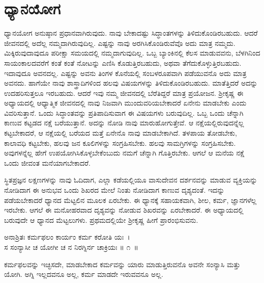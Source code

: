 
\chapter{ಧ್ಯಾನಯೋಗ}

ಧ್ಯಾನಯೋಗ ಅನುಷ್ಠಾನ ಪ್ರಧಾನವಾಗಿರುವುದು. ನಾವು ಬೇಕಾದಷ್ಟು ಸಿದ್ಧಾಂತಗಳನ್ನು ತಿಳಿದು\-ಕೊಂಡಿರಬಹುದು. ಆದರೆ ಜೀವನದಲ್ಲಿ ಅದೆಲ್ಲ ನಮ್ಮದಾಗಿರುವುದಿಲ್ಲ. ಎಷ್ಟನ್ನು ನಾವು ಅರಗಿಸಿಕೊಂಡಿರುವೆವೊ ಅದು ಮಾತ್ರ ನಮ್ಮದು. ಮಿಕ್ಕಿರುವುದಾವುದೂ ಪರೀಕ್ಷಾ ಸಮಯದಲ್ಲಿ ನಮ್ಮದಾಗುವುದಿಲ್ಲ. ಒಬ್ಬ ಬ್ಯಾಂಕಿನಲ್ಲಿ ಕೆಲಸ ಮಾಡುವವನು, ಬೆಳಗಿನಿಂದ ಸಾಯಂಕಾಲದವರೆಗೆ ಕಂತೆ ಕಂತೆ ನೋಟನ್ನು ಎಣಿಸಿ ಕೊಡುತ್ತಿರಬಹುದು, ಅಥವಾ ತೆಗೆದುಕೊಳ್ಳುತ್ತಿರಬಹುದು. ಇದಾವುದೂ ಅವನದಲ್ಲ. ಎಷ್ಟನ್ನು ಅವನು ತಿಂಗಳ ಕೊನೆಯಲ್ಲಿ ಸಂಬಳರೂಪವಾಗಿ ಪಡೆಯು\-ವನೊ ಅದು ಮಾತ್ರ ಅವನದು. ಹಾಗೆಯೇ ನಾವು ಶಾಸ್ತ್ರಾದಿಗಳಿಂದ ಹಲವು ವಿಷಯಗಳನ್ನು ತಿಳಿದುಕೊಂಡಿರಬಹುದು. ಮಾತೆತ್ತಿದರೆ ಅದನ್ನು ಉದಹರಿಸುತ್ತಲೂ ಇರಬಹುದು. ಆದರೆ ಇವು ನಮ್ಮ ಜೀವನದಲ್ಲಿ ಬೆರೆತಿದ್ದರೆ ಮಾತ್ರ ಪ್ರಯೋಜನ. ಶ‍್ರೀಕೃಷ್ಣ ಈ ಅಧ್ಯಾಯದಲ್ಲಿ ಆಧ್ಯಾತ್ಮಿಕ ಜೀವನದಲ್ಲಿ ನಾವು ನಿಜವಾಗಿ ಮುಂದುವರಿಯಬೇಕಾದರೆ ಏನೇನು ಮಾಡಬೇಕು ಎಂದು ವಿವರಿಸುತ್ತಾನೆ. ಒಂದು ಸಿದ್ಧಾಂತವನ್ನು ಪ್ರತಿಪಾದಿಸುವಾಗ ಈ ವಿಷಯಗಳು ಬರುವುದಿಲ್ಲ. ಒಬ್ಬ ಒಂದು ಚೆನ್ನಾಗಿ ಕಾಣುವ ಕಟ್ಟಡದ ನಕ್ಷೆ ಬರೆಯುತ್ತಾನೆ. ಅದನ್ನು ನೋಡಿ ನಾವು ಮಾರುಹೋಗುತ್ತೇವೆ. ಆ ನಕ್ಷೆಯಲ್ಲಿರುವುದನ್ನೆಲ್ಲ ಕಟ್ಟಬೇಕಾದರೆ, ಆ ನಕ್ಷೆಯಲ್ಲಿ ಬರೆಯದ ಮತ್ತೆ ಏನೇನೊ ನಾವು ಮಾಡಬೇಕಾಗಿದೆ. ತಳಪಾಯ ತೋಡಬೇಕು, ಕಾಲಾವಧಿ ಕಟ್ಟಬೇಕು, ಹಲವು ಜನ ಕೂಲಿಗಳನ್ನು ಸಂಗ್ರಹಿಸಬೇಕು. ಹಲವು ಸಾಮಗ್ರಿಗಳನ್ನು ಸಂಗ್ರಹಿಸಬೇಕು. ಅವುಗಳನ್ನೆಲ್ಲ ಹೇಗೆ ಉಪಯೋಗಿಸಿಕೊಳ್ಳಬೇಕೆಂಬುದು ನಮಗೆ ಚೆನ್ನಾಗಿ ಗೊತ್ತಿರಬೇಕು. ಆಗಲೆ ಆ ಮನೆಯ ನಕ್ಷೆ ಒಂದು ಜೀವಂತ ಮನೆಯಾಗಬೇಕಾದರೆ.

ಸ್ಥಿತಪ್ರಜ್ಞನ ಲಕ್ಷಣಗಳನ್ನು ನಾವು ಓದಿದಾಗ, ಎಲ್ಲಾ ಕಡೆಯಲ್ಲಿಯೂ ವಾಸುದೇವನ ದರ್ಶನವನ್ನು ಮಾಡುವ ವ್ಯಕ್ತಿಯನ್ನು ನೋಡಿದಾಗ ಈ ಅನುಭವ ಒಂದು ಶಿಖರದ ಮೇಲೆ ನಿಂತು ನೋಡಿದಾಗ ಕಾಣುವ ದೃಶ್ಯದಂತೆ. ಇದನ್ನು ಪಡೆಯಬೇಕಾದರೆ ಧ್ಯಾನದ ಮೆಟ್ಟಲಿನ ಮೂಲಕ ಏರಬೇಕು. ಈ ಧ್ಯಾನಕ್ಕೆ ಸಹಾಯಕವಾಗಿ, ಶೀಲ, ಕರ್ಮ, ಜ್ಞಾನಗಳೆಲ್ಲ ಇರಬೇಕು. ಆಗಲೆ ಈ ಮನೋಹರವಾದ ದೃಶ್ಯವನ್ನು ನೋಡುವ ಶಿಖರವನ್ನು ಏರಬೇಕಾದರೆ. ಈ ಅಧ್ಯಾಯದಲ್ಲಿ ಬರುವುದೇ ಆ ಧ್ಯಾನದ ಮೆಟ್ಟಲುಗಳು. ಪ್ರಥಮದಲ್ಲಿಯೇ ಶ‍್ರೀಕೃಷ್ಣ ಹೀಗೆ ಪ್ರಾರಂಭಿಸುವನು.

\begin{shloka}
ಅನಾಶ್ರಿತಃ ಕರ್ಮಫಲಂ ಕಾರ್ಯಂ ಕರ್ಮ ಕರೋತಿ ಯಃ~।\\ಸ ಸಂನ್ಯಾಸೀ ಚ ಯೋಗೀ ಚ ನ ನಿರಗ್ನಿರ್ನ ಚಾಕ್ರಿಯಃ \hfill॥ ೧~॥
\end{shloka}

\newpage

\begin{artha}
ಕರ್ಮಫಲವನ್ನು ಇಚ್ಛಿಸದೇ, ಮಾಡಬೇಕಾದ ಕರ್ಮವನ್ನು ಯಾರು ಮಾಡುತ್ತಿರುವನೊ ಅವನೇ ಸಂನ್ಯಾಸಿ ಮತ್ತು ಯೋಗಿ. ಅಗ್ನಿ ಇಲ್ಲದವನೂ ಅಲ್ಲ, ಕರ್ಮ ಮಾಡದೇ ಇರುವವನೂ ಅಲ್ಲ.
\end{artha}

